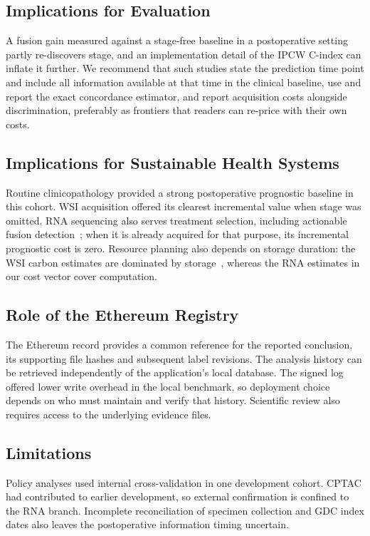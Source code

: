 \documentclass[journal,twoside]{IEEEtran}
\begin{document}
\subsection{Implications for Evaluation}
A fusion gain measured against a stage-free baseline in a postoperative setting partly re-discovers stage, and an implementation detail of the IPCW C-index can inflate it further. We recommend that such studies state the prediction time point and include all information available at that time in the clinical baseline, use and report the exact concordance estimator, and report acquisition costs alongside discrimination, preferably as frontiers that readers can re-price with their own costs.

\subsection{Implications for Sustainable Health Systems}
Routine clinicopathology provided a strong postoperative prognostic baseline in this cohort. WSI acquisition offered its clearest incremental value when stage was omitted. RNA sequencing also serves treatment selection, including actionable fusion detection~\cite{ortendahl2025}; when it is already acquired for that purpose, its incremental prognostic cost is zero. Resource planning also depends on storage duration: the WSI carbon estimates are dominated by storage~\cite{tilmant2026}, whereas the RNA estimates in our cost vector cover computation.

\subsection{Role of the Ethereum Registry}
The Ethereum record provides a common reference for the reported conclusion, its supporting file hashes and subsequent label revisions. The analysis history can be retrieved independently of the application's local database. The signed log offered lower write overhead in the local benchmark, so deployment choice depends on who must maintain and verify that history. Scientific review also requires access to the underlying evidence files.

\subsection{Limitations}
Policy analyses used internal cross-validation in one development cohort. CPTAC had contributed to earlier development, so external confirmation is confined to the RNA branch. Incomplete reconciliation of specimen collection and GDC index dates also leaves the postoperative information timing uncertain.
\end{document}
